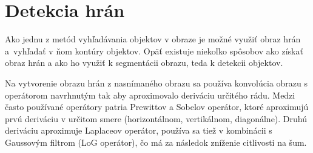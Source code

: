 \section{Detekcia hrán}

    Ako jednu z metód vyhľadávania objektov v obraze je možné využiť obraz hrán a~vyhľadať v ňom kontúry objektov. Opäť existuje niekoľko spôsobov ako získať obraz hrán a ako ho využiť k segmentácii obrazu, teda k detekcii objektov.

    Na vytvorenie obrazu hrán z nasnímaného obrazu sa používa konvolúcia obrazu s operátorom navrhnutým tak aby aproximovalo deriváciu určitého rádu. Medzi často používané operátory patria Prewittov a Sobelov operátor, ktoré aproximujú prvú deriváciu v určitom smere (horizontálnom, vertikálnom, diagonálne). Druhú deriváciu aproximuje Laplaceov operátor, používa sa tiež v kombinácii s Gaussovým filtrom (LoG operátor), čo má za následok zníženie citlivosti na šum. \cite{Samina2023}


